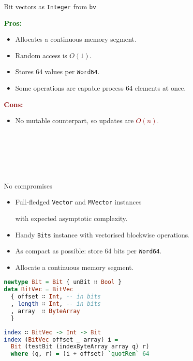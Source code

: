 \documentclass[handout]{beamer}
\def\pros{\textcolor{darkgreen}{\bf Pros:} }
\def\cons{\textcolor{darkred}{\bf Cons:} }
\begin{document}
\begin{frame}{Bit vectors as {\tt Integer} from {\tt bv}}

\pros

\begin{itemize}
\item Allocates a continuous memory segment.
\item Random access is $O(1)$.
\item Stores 64 values per {\tt Word64}.
\item Some operations are capable process 64 elements at once.
\end{itemize}

\pause

\cons

\begin{itemize}
\item No mutable counterpart, so updates are \textcolor{darkred}{$O(n)$.}
      \par ~ \par ~ \par ~
\end{itemize}

\end{frame}


\begin{frame}[fragile]{No compromises}

\begin{itemize}[<+->]
\item Full-fledged {\tt Vector} and {\tt MVector} instances \par
      with expected asymptotic complexity.
\item Handy {\tt Bits} instance with vectorised blockwise operations.
\item As compact as possible: store 64 bits per {\tt Word64}.
\item Allocate a continuous memory segment.
\end{itemize}

\pause

\begin{lstlisting}[language=Haskell]
newtype Bit = Bit { unBit ∷ Bool }
data BitVec = BitVec
  { offset ∷ Int, -- in bits
  , length ∷ Int, -- in bits
  , array  ∷ ByteArray
  }
\end{lstlisting}

\pause

\begin{lstlisting}[language=Haskell]
index ∷ BitVec -> Int -> Bit
index (BitVec offset _ array) i =
  Bit (testBit (indexByteArray array q) r)
  where (q, r) = (i + offset) `quotRem` 64
\end{lstlisting}

\end{frame}
\end{document}
